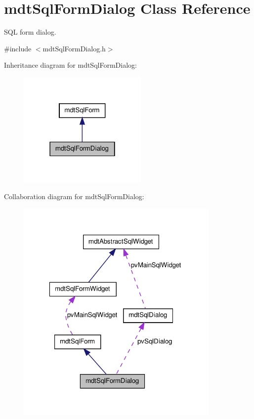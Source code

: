 \hypertarget{classmdt_sql_form_dialog}{
\section{mdtSqlFormDialog Class Reference}
\label{classmdt_sql_form_dialog}
}


SQL form dialog.  




{\ttfamily \#include $<$mdtSqlFormDialog.h$>$}



Inheritance diagram for mdtSqlFormDialog:\nopagebreak
\begin{figure}[H]
\begin{center}
\leavevmode
\includegraphics[width=178pt]{classmdt_sql_form_dialog__inherit__graph}
\end{center}
\end{figure}


Collaboration diagram for mdtSqlFormDialog:\nopagebreak
\begin{figure}[H]
\begin{center}
\leavevmode
\includegraphics[width=280pt]{classmdt_sql_form_dialog__coll__graph}
\end{center}
\end{figure}

